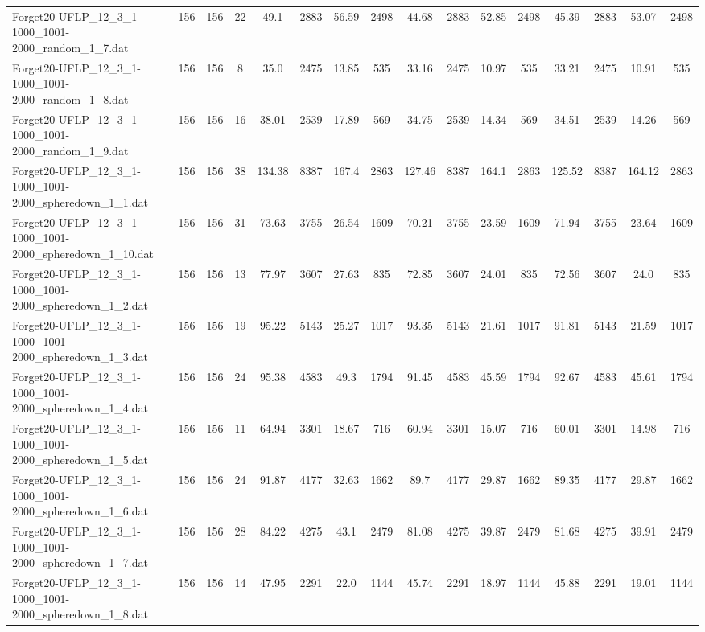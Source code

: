 \begin{sidewaystable}[!ht]
{\begin{tabular}{lccccccccccccccc}
Forget20-UFLP\_12\_3\_1-1000\_1001-2000\_random\_1\_7.dat & 156 & 156 & 22 & 49.1 & 2883 & 56.59 & 2498 &  \textcolor{blue2}{44.68} & 2883 & 52.85 & 2498 & 45.39 & 2883 & 53.07 & 2498 \\
Forget20-UFLP\_12\_3\_1-1000\_1001-2000\_random\_1\_8.dat & 156 & 156 & 8 & 35.0 & 2475 & 13.85 & 535 & 33.16 & 2475 & 10.97 & 535 & 33.21 & 2475 & 10.91 & 535 \\
Forget20-UFLP\_12\_3\_1-1000\_1001-2000\_random\_1\_9.dat & 156 & 156 & 16 & 38.01 & 2539 & 17.89 & 569 & 34.75 & 2539 & 14.34 & 569 & 34.51 & 2539 & 14.26 & 569 \\
Forget20-UFLP\_12\_3\_1-1000\_1001-2000\_spheredown\_1\_1.dat & 156 & 156 & 38 & 134.38 & 8387 & 167.4 & 2863 & 127.46 & 8387 & 164.1 & 2863 &  \textcolor{blue2}{125.52} & 8387 & 164.12 & 2863 \\
Forget20-UFLP\_12\_3\_1-1000\_1001-2000\_spheredown\_1\_10.dat & 156 & 156 & 31 & 73.63 & 3755 & 26.54 & 1609 & 70.21 & 3755 &  \textcolor{blue2}{23.59} & 1609 & 71.94 & 3755 & 23.64 & 1609 \\
Forget20-UFLP\_12\_3\_1-1000\_1001-2000\_spheredown\_1\_2.dat & 156 & 156 & 13 & 77.97 & 3607 & 27.63 & 835 & 72.85 & 3607 & 24.01 & 835 & 72.56 & 3607 &  \textcolor{blue2}{24.0} & 835 \\
Forget20-UFLP\_12\_3\_1-1000\_1001-2000\_spheredown\_1\_3.dat & 156 & 156 & 19 & 95.22 & 5143 & 25.27 & 1017 & 93.35 & 5143 & 21.61 & 1017 & 91.81 & 5143 &  \textcolor{blue2}{21.59} & 1017 \\
Forget20-UFLP\_12\_3\_1-1000\_1001-2000\_spheredown\_1\_4.dat & 156 & 156 & 24 & 95.38 & 4583 & 49.3 & 1794 & 91.45 & 4583 & 45.59 & 1794 & 92.67 & 4583 & 45.61 & 1794 \\
Forget20-UFLP\_12\_3\_1-1000\_1001-2000\_spheredown\_1\_5.dat & 156 & 156 & 11 & 64.94 & 3301 & 18.67 & 716 & 60.94 & 3301 & 15.07 & 716 & 60.01 & 3301 & 14.98 & 716 \\
Forget20-UFLP\_12\_3\_1-1000\_1001-2000\_spheredown\_1\_6.dat & 156 & 156 & 24 & 91.87 & 4177 & 32.63 & 1662 & 89.7 & 4177 &  \textcolor{blue2}{29.87} & 1662 & 89.35 & 4177 &  \textcolor{blue2}{29.87} & 1662 \\
Forget20-UFLP\_12\_3\_1-1000\_1001-2000\_spheredown\_1\_7.dat & 156 & 156 & 28 & 84.22 & 4275 & 43.1 & 2479 & 81.08 & 4275 & 39.87 & 2479 & 81.68 & 4275 & 39.91 & 2479 \\
Forget20-UFLP\_12\_3\_1-1000\_1001-2000\_spheredown\_1\_8.dat & 156 & 156 & 14 & 47.95 & 2291 & 22.0 & 1144 & 45.74 & 2291 &  \textcolor{blue2}{18.97} & 1144 & 45.88 & 2291 & 19.01 & 1144 \\

\end{tabular}}
\end{sidewaystable}
